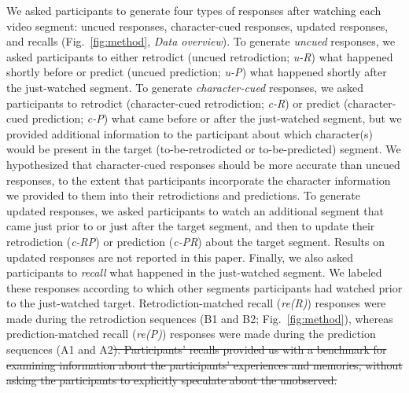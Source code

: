 \documentclass[10pt]{article}
\providecommand{\DIFaddtex}[1]{{\protect\color{blue}\uwave{#1}}} %
\providecommand{\DIFdeltex}[1]{{\protect\color{red}\sout{#1}}}                      %
\providecommand{\DIFaddbegin}{} %
\providecommand{\DIFaddend}{} %
\providecommand{\DIFdelbegin}{} %
\providecommand{\DIFadd}[1]{\texorpdfstring{\DIFaddtex{#1}}{#1}} %
\providecommand{\DIFdel}[1]{\texorpdfstring{\DIFdeltex{#1}}{}} %
\newcommand{\DIFscaledelfig}{0.5}
\newlength{\DIFdelgraphicswidth} %
\newlength{\DIFdelgraphicsheight} %
\newcommand{\DIFaddincludegraphics}[2][]{{\color{blue}\fbox{\DIFOincludegraphics[#1]{#2}}}} %
\newcommand{\DIFdelincludegraphics}[2][]{%
\sbox{\DIFdelgraphicsbox}{\DIFOincludegraphics[#1]{#2}}%
\settoboxwidth{\DIFdelgraphicswidth}{\DIFdelgraphicsbox} %
\settoboxtotalheight{\DIFdelgraphicsheight}{\DIFdelgraphicsbox} %
\scalebox{\DIFscaledelfig}{%
\parbox[b]{\DIFdelgraphicswidth}{\usebox{\DIFdelgraphicsbox}\\[-\baselineskip] \rule{\DIFdelgraphicswidth}{0em}}\llap{\resizebox{\DIFdelgraphicswidth}{\DIFdelgraphicsheight}{%
\setlength{\unitlength}{\DIFdelgraphicswidth}%
\begin{picture}(1,1)%
\thicklines\linethickness{2pt} %
{\color[rgb]{1,0,0}\put(0,0){\framebox(1,1){}}}%
{\color[rgb]{1,0,0}\put(0,0){\line( 1,1){1}}}%
{\color[rgb]{1,0,0}\put(0,1){\line(1,-1){1}}}%
\end{picture}%
}\hspace*{3pt}}} %
} %
\DeclareRobustCommand{\DIFaddbegin}{\DIFOaddbegin \let\includegraphics\DIFaddincludegraphics} %
\DeclareRobustCommand{\DIFaddend}{\DIFOaddend \let\includegraphics\DIFOincludegraphics} %
\DeclareRobustCommand{\DIFdelbegin}{\DIFOdelbegin \let\includegraphics\DIFdelincludegraphics} %
\begin{document}
We asked participants \DIFaddbegin \DIFadd{in our main experiment }\DIFaddend to generate four types of responses after watching each video segment: uncued responses, character-cued responses, updated responses, and recalls (Fig.~\ref{fig:method}, \textit{Data overview}). To generate \textit{uncued} responses, we asked participants to either retrodict (uncued retrodiction; \textit{u-R}) what happened shortly before or predict (uncued prediction; \textit{u-P}) what happened shortly after the just-watched segment. To generate \textit{character-cued} responses, we asked participants to retrodict (character-cued retrodiction; \textit{c-R}) or predict (character-cued prediction; \textit{c-P}) what came before or after the just-watched segment, but we provided additional information to the participant about which character(s) would be present in the target (to-be-retrodicted or to-be-predicted) segment. We hypothesized that character-cued responses should be more accurate than uncued responses, to the extent that participants incorporate the character information we provided to them into their retrodictions and predictions. To generate updated responses, we asked participants to watch an additional segment that came just prior to or just after the target segment, and then to update their retrodiction (\textit{c-RP}) or prediction (\textit{c-PR}) about the target segment. Results on updated responses are not reported in this paper. Finally, we also asked participants to \textit{recall} what happened in the just-watched segment. We labeled these responses according to which other segments participants had watched prior to the just-watched target. Retrodiction-matched recall (\textit{re(R)}) responses were made during the retrodiction sequences (B1 and B2; Fig.~\ref{fig:method}), whereas prediction-matched recall (\textit{re(P)}) responses were made during the prediction sequences (A1 and A2\DIFdelbegin \DIFdel{).  Participants' recalls provided us with a benchmark for examining information about the participants' experiences and memories, without asking the participants to explicitly speculate about the unobserved.
}%
\end{document}
